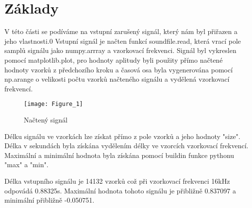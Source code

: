 \section{Základy}

V této části se podíváme na vstupní zarušený signál, který nám byl přiřazen a jeho vlastnosti.0
Vstupní signál je načten funkcí soundfile.read, která vrací pole samplů signálu jako numpy.arrray a vzorkovací frekvenci.
Signál byl vykreslen pomocí matplotlib.plot, pro hodnoty aplitudy byli použity přímo načtené hodnoty vzorků z předchozího kroku a časová osa byla vygenerována pomocí np.arange o velikosti počtu vzorků načteného signálu a vydělená vzorkovací frekvencí.

\begin{figure}[H] 
    \centering
    \texttt{[image: Figure\_1]}
    \caption{Načtený signál}
\end{figure}

Délku signálu ve vzorkách lze získat přímo z pole vzorků a jeho hodnoty "size". Délka v sekundách byla získána vydělením délky ve vzorcích vzorkovací frekvencí.
Maximální a minimální hodnota byla získána pomocí buildin funkce pythonu "max" a "min".

Délka vstupního signálu je 14132 vzorků což při vzorkovací frekvenci 16kHz odpovádá 0.88325s.
Maximální hodnota tohoto signálu je přibližně 0.837097 a minimální přibližně -0.050751.
